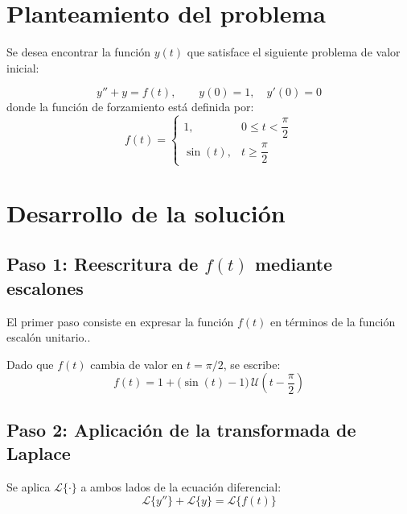 \documentclass[12pt, a4paper]{article}
\newcommand{\Lap}{\mathcal{L}}
\newcommand{\U}{\mathcal{U}}
\newenvironment{resultado}{%
    \begin{tcolorbox}[resultstyle]%
}{%
    \end{tcolorbox}%
}
\begin{document}

\section{Planteamiento del problema}

Se desea encontrar la función $y(t)$ que satisface el siguiente problema de valor inicial:

\begin{resultado}
\[
    y'' + y = f(t), \qquad y(0) = 1, \quad y'(0) = 0
\]
donde la función de forzamiento está definida por:
\[
    f(t) =
    \begin{cases}
        1, & 0 \leq t < \dfrac{\pi}{2} \\[8pt]
        \sin(t), & t \geq \dfrac{\pi}{2}
    \end{cases}
\]
\end{resultado}


\section{Desarrollo de la solución}

\subsection{Paso 1: Reescritura de \texorpdfstring{$f(t)$}{f(t)} mediante escalones}

El primer paso consiste en expresar la función $f(t)$ en términos de la función escalón unitario..

Dado que $f(t)$ cambia de valor en $t = \pi/2$, se escribe:
\[
    f(t) = 1 + \bigl(\sin(t) - 1\bigr)\,\U\!\left(t - \frac{\pi}{2}\right)
\]

\subsection{Paso 2: Aplicación de la transformada de Laplace}

Se aplica $\Lap\{\cdot\}$ a ambos lados de la ecuación diferencial:
\[
    \Lap\{y''\} + \Lap\{y\} = \Lap\{f(t)\}
\]
\end{document}
